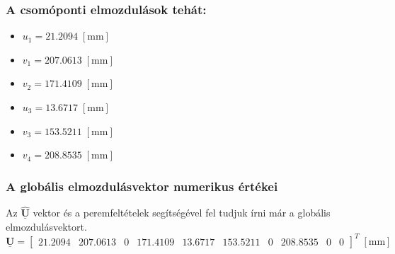 \documentclass[12pt,a4paper]{article}
\def\vec#1{\underline{\mathbf{#1}}}
\def\mili{\; \left[\mathrm{mm}\right]}
\begin{document}
\subsubsection*{A csomóponti elmozdulások tehát:}
\begin{multicols}{2}
    \begin{itemize}
        \item $u_1=21.2094 \mili$
        \item $v_1=207.0613 \mili$
        \item $v_2=171.4109 \mili$
    \end{itemize}
    \columnbreak
    \begin{itemize}
        \item $u_3=13.6717 \mili$
        \item $v_3=153.5211 \mili$
        \item $v_4=208.8535 \mili$
    \end{itemize}
\end{multicols}
\subsubsection{A globális elmozdulásvektor numerikus értékei}
Az $\vec{\hat{U}}$ vektor és a peremfeltételek segítségével fel tudjuk írni már
a globális elmozdulásvektort.
\begin{equation}
    \vec{U}=
    \begin{bmatrix}
        21.2094  &
        207.0613 &
        0        &
        171.4109 &
        13.6717  &
        153.5211 &
        0        &
        208.8535 &
        0        &
        0
    \end{bmatrix}^{T} \mili
\end{equation}
\newpage
\end{document}
